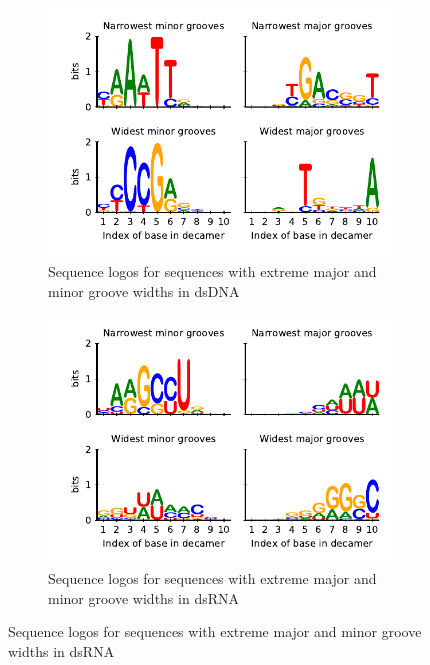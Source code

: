 \begin{figure}
  \begin{subfigure}{15cm}
    \centering\includegraphics[width=10cm]{images/DNA_groove_seq_logo.pdf}
    \centering\caption{Sequence logos for sequences with extreme major and minor groove widths in dsDNA}
  \end{subfigure}

  \begin{subfigure}{15cm}
    \centering\includegraphics[width=10cm]{images/RNA_groove_seq_logo.pdf}
    \centering\caption{Sequence logos for sequences with extreme major and minor groove widths in dsRNA}
    \end{subfigure}


\end{figure}

